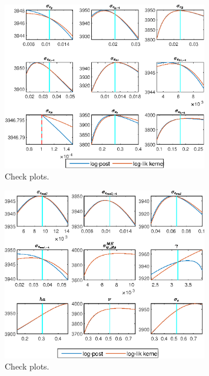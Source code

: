  
\begin{figure}[H]
\centering 
\includegraphics[width=0.80\textwidth]{RBC_sectoral/graphs/RBC_sectoral_CheckPlots1}
\caption{Check plots.}\label{Fig:CheckPlots:1}
\end{figure}
 
\begin{figure}[H]
\centering 
\includegraphics[width=0.80\textwidth]{RBC_sectoral/graphs/RBC_sectoral_CheckPlots2}
\caption{Check plots.}\label{Fig:CheckPlots:2}
\end{figure}
 
